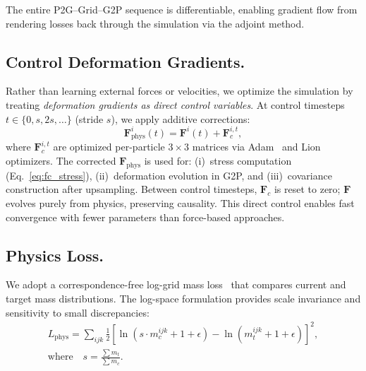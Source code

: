     The entire P2G--Grid--G2P sequence is differentiable, enabling gradient flow from rendering losses back through the simulation via the adjoint method.
        
\subsection{Control Deformation Gradients.}
    Rather than learning external forces or velocities, we optimize the simulation by treating \emph{deformation gradients as direct control variables}. At control timesteps $t \in \{0, s, 2s, \ldots\}$ (stride $s$), we apply additive corrections:
    \begin{equation}
    \label{eq:control_F}
    \mathbf{F}_{\text{phys}}^i(t) = \mathbf{F}^i(t) + \mathbf{F}_c^{i,t},
    \end{equation}
    where $\mathbf{F}_c^{i,t}$ are optimized per-particle $3{\times}3$ matrices via Adam~\citep{kingma2017adammethodstochasticoptimization} and Lion~\citep{chen2023symbolicdiscoveryoptimizationalgorithms} optimizers. The corrected $\mathbf{F}_{\text{phys}}$ is used for:
    (i)~stress computation (Eq.~\ref{eq:fc_stress}), 
    (ii)~deformation evolution in G2P, and 
    (iii)~covariance construction after upsampling. 
    Between control timesteps, $\mathbf{F}_c$ is reset to zero; $\mathbf{F}$ evolves purely from physics, preserving causality. This direct control enables fast convergence with fewer parameters than force-based approaches.
    
\subsection{Physics Loss.}
    We adopt a correspondence-free log-grid mass loss~\citep{11088224} that compares current and target mass distributions. The log-space formulation provides scale invariance and sensitivity to small discrepancies:
    \begin{equation}
    \begin{gathered}
    L_{\text{phys}} = \sum_{ijk} \frac{1}{2}\left[\ln(s \cdot m_c^{ijk}+1+\epsilon) - \ln(m_t^{ijk}+1+\epsilon)\right]^2, \\
    \text{where}\quad s = \frac{\sum m_t}{\sum m_c}.
    \end{gathered}
    \end{equation}
    
